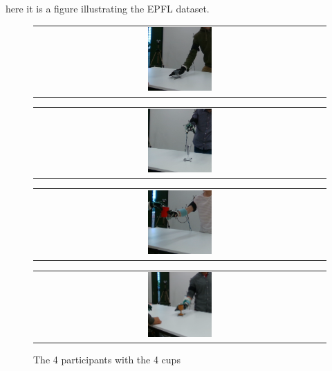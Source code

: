 here it is a figure illustrating the EPFL dataset.
    \begin{figure}
        \centering
        \begin{tabular}{@{}c@{}}
            \centering
            \includegraphics[width=0.225\textwidth]{Images/frame000023.png}
        \end{tabular}
        \begin{tabular}{@{}c@{}}
            \centering 
            \includegraphics[width=0.224\textwidth]{Images/frame000046.png}
        \end{tabular}
        \baselineskip
        \begin{tabular}{@{}c@{}}
            \centering 
            \includegraphics[width=0.226\textwidth]{Images/frame000117.png}
        \end{tabular}
        \begin{tabular}{@{}c@{}}
            \centering 
            \includegraphics[width=0.223\textwidth]{Images/frame000144.png}
        \end{tabular}
        \caption{The 4 participants with the 4 cups}
        \label{fig:epfl_dataset}
    \end{figure}

